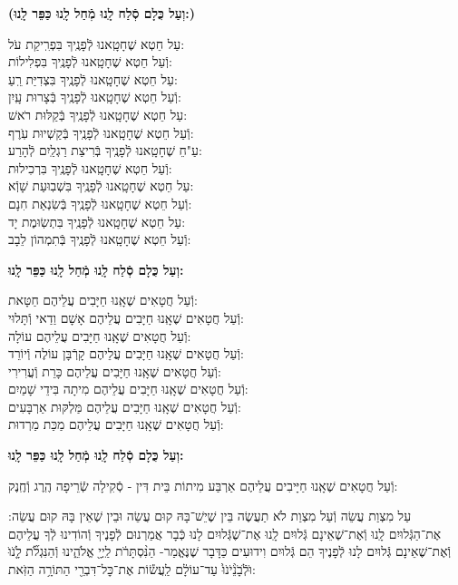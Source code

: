\documentclass[twoside, openany, parskip=half, 11pt]{book}
\begin{document}
\textbf{(וְעַל כֻּלָם סְֿלַח לָֽנוּ מְֿחַל לָֽנוּ כַּפֵּר לָֽנוּ:)}

עַל חֵטְא שֶׁחָטָֽאנוּ לְֿפָנֶֽיךָ בִּפְרִֽיקַת עֹל:\\ וְֿעַל חֵטְא שֶׁחָטָֽאנוּ לְֿפָנֶֽיךָ בִּפְלִילוֹת: \\
עַל חֵטְא שֶׁחָטָֽאנוּ לְֿפָנֶֽיךָ בִּצְדִיַּת רֵֽעַ: \\ וְֿעַל חֵטְא שֶׁחָטָֽאנוּ לְֿפָנֶֽיךָ בְּֿצָרוּת עָֽיִן: \\
עַל חֵטְא שֶׁחָטָֽאנוּ לְֿפָנֶֽיךָ בְּֿקַלּוּת רֹאשׁ:\\ וְֿעַל חֵטְא שֶׁחָטָֽאנוּ לְֿפָנֶֽיךָ בְּֿקַשְׁיוּת עֹֽרֶף: \\
עַ"חֵ שֶׁחָטָֽאנוּ לְֿפָנֶֽיךָ בְּֿרִיצַת רַגְלַֽיִם לְֿהָרַע:\\ וְֿעַל חֵטְא שֶׁחָטָֽאנוּ לְֿפָנֶֽיךָ בִּרְכִילוּת: \\
עַל חֵטְא שֶׁחָטָֽאנוּ לְֿפָנֶֽיךָ בִּשְׁבֽוּעַת שָׁוְֿא: \\ וְֿעַל חֵטְא שֶׁחָטָֽאנוּ לְֿפָנֶֽיךָ בְּֿשִׂנְאַת חִנָם: \\
עַל חֵטְא שֶׁחָטָֽאנוּ לְֿפָנֶֽיךָ בִּתְשֽׂוּמֶת יָד:\\ וְֿעַל חֵטְא שֶׁחָטָֽאנוּ לְֿפָנֶֽיךָ בְּֿתִמְהוֹן לֵבָב:

\textbf{וְעַל כֻּלָם סְֿלַח לָֽנוּ מְֿחַל לָֽנוּ כַּפֵּר לָֽנוּ:}


וְֿעַל חֲטָאִים שֶׁאָֽנוּ חַיָּבִים עֲלֵיהֶם חַטָּאת:\\
וְֿעַל חֲטָאִים שֶׁאָֽנוּ חַיָּבִים עֲלֵיהֶם אָשָׁם וַדַאי וְֿתָּלוּי:\\
וְֿעַל חֲטָאִים שֶׁאָֽנוּ חַיָּבִים עֲלֵיהֶם עוֹלָה:\\
וְֿעַל חֲטָאִים שֶׁאָֽנוּ חַיָּבִים עֲלֵיהֶם קָרְֿבָּן עוֹלֶה וְֿיוֹרֵד:\\
וְֿעַל חֲטָאִים שֶׁאָֽנוּ חַיָּבִים עֲלֵיהֶם כָּרֵת וְֿעֲרִירִי:\\
וְֿעַל חֲטָאִים שֶׁאָֽנוּ חַיָּבִים עֲלֵיהֶם מִיתָה בִּידֵי שָׁמַיִם:\\
וְֿעַל חֲטָאִים שֶׁאָֽנוּ חַיָּבִים עֲלֵיהֶם מַּלְקּוּת אַרְבָּעִים:\\
וְֿעַל חֲטָאִים שֶׁאָֽנוּ חַיָּבִים עֲלֵיהֶם מַכַּת מַרְדוּת:



\textbf{וְעַל כֻּלָם סְֿלַח לָֽנוּ מְֿחַל לָֽנוּ כַּפֵּר לָֽנוּ:}

וְֿעַל חֲטָאִים שֶׁאָֽנוּ חַיָּיבִים עֲלֵיהֶם אַרְבַּע מִיתוֹת בֵּית דִּין - סְֿקִילָה שְֿׂרֵיפָה הֶֽרֶג וְֿחֶֽנֶק:

עַל מִצְוַת עֲשֵׂה וְֿעַל מִצְוַת לֹא תַעֲשֶׂה בֵּין שֶׁיֵשׁ־בָּהּ קוּם עֲשֵׂה וּבֵין שֶׁאֵין בָּהּ קוּם עֲשֵׂה: אֶת־הַגְּֿלוּיִם לָֽנוּ וְֿאֶת־שֶׁאֵינָם גְּֿלוּיִם לָֽנוּ אֶת־שֶׁגְּֿלוּיִם לָנוּ כְּֿבָר אֲמַרְנוּם לְֿפָנֶיךָ וְֿהוֹדִינוּ לְֿךָ עֲלֵיהֶם וְֿאֶת־שֶׁאֵינָם גְּֿלוּיִם לָנוּ לְֿפָנֶיךָ הֵם גְּֿלוּיִם וִידוּעִים כַּדָּבָר שֶׁנֶּאֱמַר- הַנִּ֨סְתָּרֹ֔ת
לַֽיְיָ֖ אֱלֹהֵ֑ינוּ וְֿהַנִּגְלֹ֞ת לָֹ֤נֹוֹּ וֹּלְֹֿבָֹנֵֹ֨יֹנֹוֹּ֙ עַד־עוֹלָ֔ם לַֽעֲשׂ֕וֹת אֶת־כׇּל־דִּבְרֵ֖י הַתּוֹרָ֥ה הַזֹּֽאת:
\end{document}
